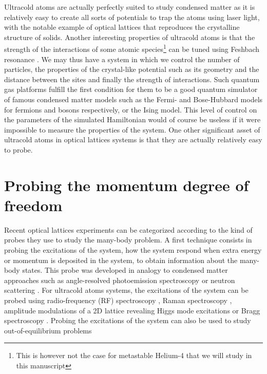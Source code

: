 Ultracold atoms are actually perfectly suited to study condensed matter as it is relatively easy to create all sorts of potentials to trap the atoms using laser light, with the notable example of optical lattices \cite{bloch2005ultracold} that reproduces the crystalline structure of solids. Another interesting properties of ultracold atoms is that the strength of the interactions of some atomic species\footnote{This is however not the case for metastable Helium-4 that we will study in this manuscript} can be tuned using Feshbach resonance \cite{chin2010feshbach,feshbach1958unified}. We may thus have a system in which we control the number of particles, the properties of the crystal-like potential such as its geometry and the distance between the sites and finally the strength of interactions. Such quantum gas platforms fulfill the first condition for them to be a good quantum simulator of famous condensed matter models such as the Fermi- and Bose-Hubbard models for fermions and bosons respectively, or the Ising model. This level of control on the parameters of the simulated Hamiltonian would of course be useless if it were impossible to measure the properties of the system. One other significant asset of ultracold atoms in optical lattices systems is that they are actually relatively easy to probe.

\section*{Probing the momentum degree of freedom}

Recent optical lattices experiments can be categorized according to the kind of probes they use to study the many-body problem. A first technique consists in probing the excitations of the system, \ie how the system respond when extra energy or momentum is deposited in the system, to obtain information about the many-body states. This probe was developed in analogy to condensed matter approaches such as angle-resolved photoemission spectroscopy \cite{damascelli2003angle} or neutron scattering \cite{ashcroft1976solid}. For ultracold atoms systems, the excitations of the system can be probed using radio-frequency (RF) spectroscopy \cite{stewart2008using}, Raman spectroscopy \cite{dao2007measuring}, amplitude modulations of a 2D lattice revealing Higgs mode excitations \cite{endres2012higgs} or Bragg spectroscopy \cite{sobirey2021observation,steinhauer2002excitation}. Probing the excitations of the system can also be used to study out-of-equilibrium problems 

